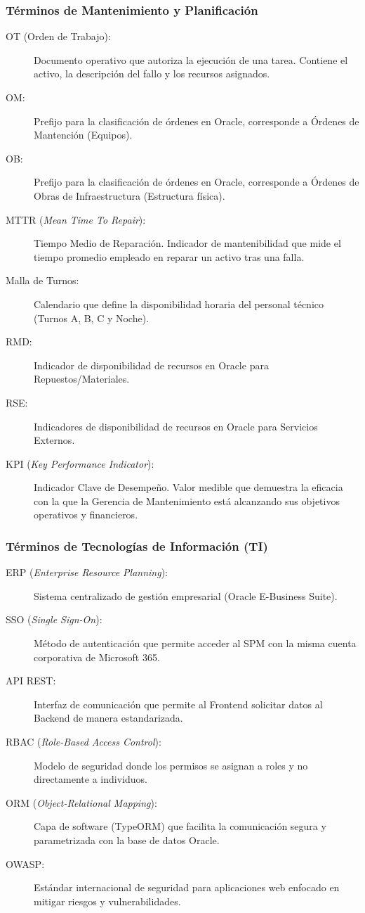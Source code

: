 \documentclass[11pt, letterpaper]{article}
\begin{document}
\subsubsection{Términos de Mantenimiento y Planificación}
\begin{description}
    \item[OT (Orden de Trabajo):] Documento operativo que autoriza la ejecución de una tarea. Contiene el activo, la descripción del fallo y los recursos asignados.
    \item[OM:] Prefijo para la clasificación de órdenes en Oracle, corresponde a Órdenes de Mantención (Equipos).
    \item[OB:] Prefijo para la clasificación de órdenes en Oracle, corresponde a Órdenes de Obras de Infraestructura (Estructura física).
    \item[MTTR (\textit{Mean Time To Repair}):] Tiempo Medio de Reparación. Indicador de mantenibilidad que mide el tiempo promedio empleado en reparar un activo tras una falla.
    \item[Malla de Turnos:] Calendario que define la disponibilidad horaria del personal técnico (Turnos A, B, C y Noche).
    \item[RMD:] Indicador de disponibilidad de recursos en Oracle para Repuestos/Materiales.
    \item[RSE:] Indicadores de disponibilidad de recursos en Oracle para Servicios Externos.
    \item[KPI (\textit{Key Performance Indicator}):] Indicador Clave de Desempeño. Valor medible que demuestra la eficacia con la que la Gerencia de Mantenimiento está alcanzando sus objetivos operativos y financieros.
\end{description}

\subsubsection{Términos de Tecnologías de Información (TI)}
\begin{description}
    \item[ERP (\textit{Enterprise Resource Planning}):] Sistema centralizado de gestión empresarial (Oracle E-Business Suite).
    \item[SSO (\textit{Single Sign-On}):] Método de autenticación que permite acceder al SPM con la misma cuenta corporativa de Microsoft 365.
    \item[API REST:] Interfaz de comunicación que permite al Frontend solicitar datos al Backend de manera estandarizada.
    \item[RBAC (\textit{Role-Based Access Control}):] Modelo de seguridad donde los permisos se asignan a roles y no directamente a individuos.
    \item[ORM (\textit{Object-Relational Mapping}):] Capa de software (TypeORM) que facilita la comunicación segura y parametrizada con la base de datos Oracle.
    \item[OWASP:] Estándar internacional de seguridad para aplicaciones web enfocado en mitigar riesgos y vulnerabilidades.
\end{description}
\end{document}

